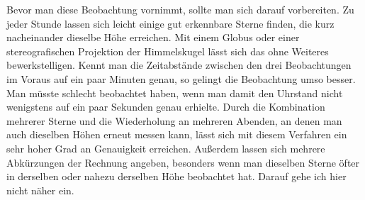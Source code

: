 Bevor man diese Beobachtung vornimmt, sollte man sich darauf vorbereiten. Zu jeder Stunde lassen sich leicht einige gut erkennbare Sterne finden, die kurz nacheinander dieselbe Höhe erreichen. Mit einem Globus oder einer stereografischen Projektion der Himmelskugel lässt sich das ohne Weiteres bewerkstelligen. Kennt man die Zeitabstände zwischen den drei Beobachtungen im Voraus auf ein paar Minuten genau, so gelingt die Beobachtung umso besser. Man müsste schlecht beobachtet haben, wenn man damit den Uhrstand nicht wenigstens auf ein paar Sekunden genau erhielte. Durch die Kombination mehrerer Sterne und die Wiederholung an mehreren Abenden, an denen man auch dieselben Höhen erneut messen kann, lässt sich mit diesem Verfahren ein sehr hoher Grad an Genauigkeit erreichen. Außerdem lassen sich mehrere Abkürzungen der Rechnung angeben, besonders wenn man dieselben Sterne öfter in derselben oder nahezu derselben Höhe beobachtet hat. Darauf gehe ich hier nicht näher ein.

